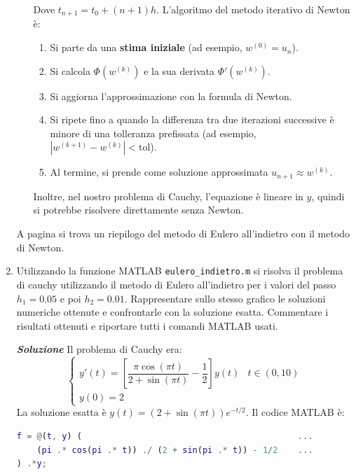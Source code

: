 \begin{enumerate}
\begin{enumerate}
\begin{equation*}
        \end{equation*}
        Dove $t_{n+1} = t_0 + (n+1) h$.
        L'algoritmo del metodo iterativo di Newton è:
        \begin{enumerate}
            \item Si parte da una \textbf{stima iniziale} (ad esempio, $w^{(0)} = u_n$).
            \item Si calcola $\Phi(w^{(k)})$ e la sua derivata $\Phi'(w^{(k)})$.
            \item Si aggiorna l'approssimazione con la formula di Newton.
            \item Si ripete fino a quando la differenza tra due iterazioni successive è minore di una tolleranza prefissata (ad esempio, $|w^{(k+1)} - w^{(k)}| < \text{tol}$).
            \item Al termine, si prende come soluzione approssimata $u_{n+1} \approx w^{(k)}$.
        \end{enumerate}
        Inoltre, nel nostro problema di Cauchy, l'equazione è lineare in $y$, quindi si potrebbe risolvere direttamente senza Newton.
    \end{enumerate}
    A pagina  si trova un riepilogo del metodo di Eulero all'indietro con il metodo di Newton.

    
    \item Utilizzando la funzione MATLAB \texttt{eulero\_indietro.m} si risolva il problema di cauchy utilizzando il metodo di Eulero all'indietro per i valori del passo $h_{1} = 0.05$ e poi $h_{2} = 0.01$. Rappresentare sullo stesso grafico le soluzioni numeriche ottenute e confrontarle con la soluzione esatta. Commentare i risultati ottenuti e riportare tutti i comandi MATLAB usati.

    \textcolor{Green3}{\textbf{\emph{Soluzione}}} Il problema di Cauchy era:
    \begin{equation*}
        \begin{cases}
            y'(t) = \left[\dfrac{\pi \cos\left(\pi t\right)}{2 + \sin\left(\pi t\right)} - \dfrac{1}{2}\right] y(t) & t \in \left(0, 10\right) \\[1em]
            y(0) = 2
        \end{cases}
    \end{equation*}
    La soluzione esatta è $y(t) = \left(2 + \sin\left(\pi t\right)\right) e^{- t/2}$. Il codice MATLAB è:
    \begin{lstlisting}[language=MATLAB]
% problema Cauchy
f = @(t, y) (                                           ...
    (pi .* cos(pi .* t)) ./ (2 + sin(pi .* t)) - 1/2    ...
) .*y;


\end{lstlisting}
\end{enumerate}
